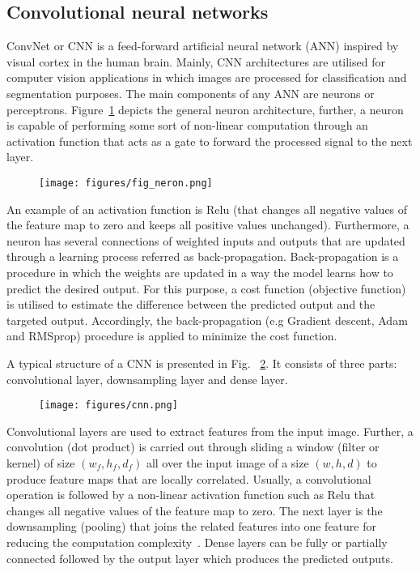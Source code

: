 \subsection{Convolutional neural networks}
ConvNet or CNN is a feed-forward artificial neural network (ANN) inspired by visual cortex in the human brain.
Mainly, CNN architectures are utilised for computer vision applications in which images are processed for classification and segmentation purposes.
The main components of any ANN are neurons or perceptrons.
Figure~\ref{fig:neuron} depicts the general neuron architecture, further, a neuron is capable of performing some sort of non-linear computation through an activation function that acts as a gate to forward the processed signal to the next layer.
\begin{figure}
	\begin{center}
		\texttt{[image: figures/fig\_neron.png]}
	\end{center}
	\label{fig:neuron}
\end{figure}
An example of an activation function is Relu (that changes all negative values of the feature map to zero and keeps all positive values unchanged).
Furthermore, a neuron has several connections of weighted inputs and outputs that are updated through a learning process referred as back-propagation. 
Back-propagation is a procedure in which the weights are updated in a way the model learns how to predict the desired output.
For this purpose, a cost function (objective function) is utilised to estimate the difference between the predicted output and the targeted output.
Accordingly, the back-propagation (e.g Gradient descent, Adam and RMSprop) procedure is applied to minimize the cost function.

A typical structure of a CNN is presented in Fig. ~\ref{CNN}. 
It consists of three parts: convolutional layer, downsampling layer and dense layer.
\begin{figure}
	\begin{center}
		\texttt{[image: figures/cnn.png]}
	\end{center}
	\label{CNN}
\end{figure}
Convolutional layers are used to extract features from the input image.
Further, a convolution (dot product) is carried out through sliding a window (filter or kernel) of size \((w_f,h_f,d_f)\) all over the input image of a size \((w,h,d)\)  to produce feature maps that are locally correlated.
Usually, a convolutional operation is followed by a non-linear activation function such as Relu that changes all negative values of the feature map to zero.
The next layer is the downsampling (pooling) that joins the related features into one feature for reducing the computation complexity~\cite{LeCun}. 
Dense layers can be fully or partially connected followed by the output layer which produces the predicted outputs. 
